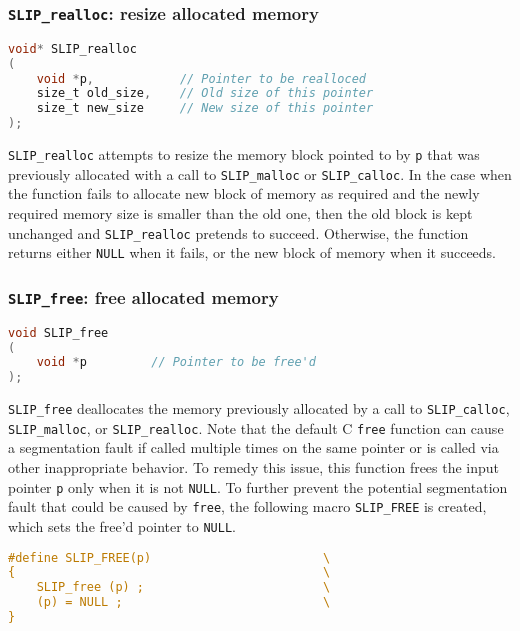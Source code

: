 \documentclass[11pt]{article}
\theoremstyle{definition}
\begin{document}
\cprotect\subsubsection{\verb|SLIP_realloc|: resize allocated memory}

\begin{lstlisting}[language=C,frame=single]
void* SLIP_realloc
(
    void *p,            // Pointer to be realloced
    size_t old_size,    // Old size of this pointer
    size_t new_size     // New size of this pointer
);
\end{lstlisting}

\verb|SLIP_realloc| attempts to resize the memory block pointed to by \verb|p| that was previously allocated with a call to \verb|SLIP_malloc| or \verb|SLIP_calloc|. In the case when the function fails to allocate new block of memory as required and the newly required memory size is smaller than the old one, then the old block is kept unchanged and \verb|SLIP_realloc| pretends to succeed. Otherwise, the function returns either \verb|NULL| when it fails, or the new block of memory when it succeeds.


\cprotect\subsubsection{\verb|SLIP_free|: free allocated memory}\label{ss:SLIP_free}

\begin{lstlisting}[language=C,frame=single]
void SLIP_free
(
    void *p         // Pointer to be free'd
);
\end{lstlisting}

\verb|SLIP_free| deallocates the memory previously allocated by a call to \verb|SLIP_calloc|, \verb|SLIP_malloc|, or \verb|SLIP_realloc|. Note that the default C \verb|free| function can cause a segmentation fault if called multiple times on the same pointer or is called via other inappropriate behavior. To remedy this issue, this function frees  the input pointer \verb|p| only when it is not \verb|NULL|. To further prevent the potential segmentation fault that could be caused by \verb|free|, the following macro \verb|SLIP_FREE| is created, which sets the free'd pointer to \verb|NULL|.

\begin{lstlisting}[language=C,frame=single]
#define SLIP_FREE(p)                        \
{                                           \
    SLIP_free (p) ;                         \
    (p) = NULL ;                            \
}
\end{lstlisting}
\end{document}
